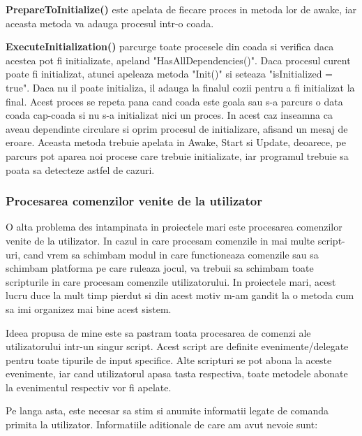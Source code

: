 \documentclass[12pt, a4paper]{article}
\begin{document}
	\textbf{PrepareToInitialize()} este apelata de fiecare proces in metoda lor de awake, iar aceasta metoda va adauga procesul intr-o coada.
	
	\textbf{ExecuteInitialization()} parcurge toate procesele din coada si verifica daca acestea pot fi initializate, apeland "HasAllDependencies()". Daca procesul curent poate fi initializat, atunci apeleaza metoda "Init()" si seteaza "isInitialized = true". Daca nu il poate initializa, il adauga la finalul cozii pentru a fi initializat la final. Acest proces se repeta pana cand coada este goala sau s-a parcurs o data coada cap-coada si nu s-a initializat nici un proces. In acest caz inseamna ca aveau dependinte circulare si oprim procesul de initializare, afisand un mesaj de eroare. Aceasta metoda trebuie apelata in Awake, Start si Update, deoarece, pe parcurs pot aparea noi procese care trebuie initializate, iar programul trebuie sa poata sa detecteze astfel de cazuri.
	
	\subsubsection{Procesarea comenzilor venite de la utilizator}
	
	O alta problema des intampinata in proiectele mari este procesarea comenzilor venite de la utilizator. In cazul in care procesam comenzile in mai multe script-uri, cand vrem sa schimbam modul in care functioneaza comenzile sau sa schimbam platforma pe care ruleaza jocul, va trebuii sa schimbam toate scripturile in care procesam comenzile utilizatorului. In proiectele mari, acest lucru duce la mult timp pierdut si din acest motiv m-am gandit la o metoda cum sa imi organizez mai bine acest sistem.
	
	Ideea propusa de mine este sa pastram toata procesarea de comenzi ale utilizatorului intr-un singur script. Acest script are definite evenimente/delegate pentru toate tipurile de input specifice. Alte scripturi se pot abona la aceste evenimente, iar cand utilizatorul apasa tasta respectiva, toate metodele abonate la evenimentul respectiv vor fi apelate.
	
	Pe langa asta, este necesar sa stim si anumite informatii legate de comanda primita la utilizator. Informatiile aditionale de care am avut nevoie sunt:
	
\end{document}
